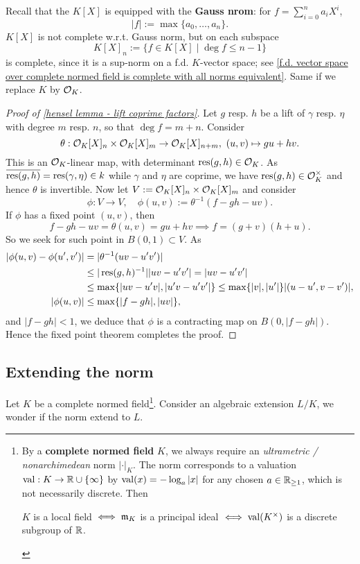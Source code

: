 Recall that the $K[X]$ is equipped with the \textbf{Gauss nrom}: for $f = \sum_{i=0}^n a_iX^i$,
\[|f| := \max\{a_0, \dots, a_n\}.\]
$K[X]$ is not complete w.r.t.\! Gauss norm,
but on each subspace\[K[X]_n := \{f\in K[X]\mid \deg f\le n - 1\}\]
is complete, since it is a sup-norm on a f.d.\! $K$-vector space;
see \cref{f.d. vector space over complete normed field is complete with all norms equivalent}.
Same if we replace $K$ by $\mathcal{O}_K$.
\begin{proof}
    [Proof of \cref{hensel lemma - lift coprime factors}]
    Let $g$ resp.\! $h$ be a lift of $\gamma$ resp.\! $\eta$ with degree $m$ resp.\! $n$,
    so that $\deg f = m + n$.
    Consider\[\theta : \mathcal{O}_K[X]_n\times \mathcal{O}_K[X]_m\to \mathcal{O}_K[X]_{n+m},\ (u, v)\mapsto gu + hv.\]
    This is an $\mathcal{O}_K$-linear map, with determinant $\operatorname{res}(g, h)\in \mathcal{O}_K$.
    As $\overline{\operatorname{res}(g, h)} = \operatorname{res}(\gamma, \eta)\in k$
    while $\gamma$ and $\eta$ are coprime, we have $\operatorname{res}(g, h)\in\mathcal{O}_K^\times$ and hence $\theta$ is invertible.
    Now let $V := \mathcal{O}_K[X]_n\times \mathcal{O}_K[X]_m$ and consider \[\phi : V\to V,\quad \phi(u, v) := \theta^{-1}(f - gh - uv).\]
    If $\phi$ has a fixed point $(u, v)$,
    then \[f - gh - uv = \theta(u, v) = gu + hv\implies f = (g + v)(h + u).\]
    So we seek for such point in $B(0, 1)\subset V $.
    As \begin{align*}
        |\phi(u, v) - \phi(u', v')| &= |\theta^{-1}(uv - u'v')|\\ &
        \le |\operatorname{res}(g, h)^{-1}| |uv - u'v'| = |uv - u'v'|\\ &
        \le \max\{|uv - u'v|, |u'v - u'v'|\}
        \le \max\{|v|, |u'|\}|(u - u', v - v')|,\\
        |\phi(u, v)| &\le\max\{|f - gh|, |uv|\},
    \end{align*}
    and $|f - gh| < 1$,
    we deduce that $\phi$ is a contracting map on $B(0, |f - gh|)$.
    Hence the fixed point theorem completes the proof.
\end{proof}

\subsection{Extending the norm}
Let $K$ be a complete normed field\footnote{By a \textbf{complete normed field} $K$,
we always require an \textit{ultrametric / nonarchimedean} norm $|\cdot|_K$. The norm corresponds to a valuation $\operatorname{val} : K\to\mathbb{R}\cup\{\infty\}$ by $\operatorname{val}(x) = -\log_a|x|$ for any chosen $a\in \mathbb{R}_{\ge 1}$, which is not necessarily discrete.
Then \begin{center}
    $K$ is a local field $\iff \mathfrak{m}_K$ is a principal ideal $\iff \operatorname{val}(K^\times)$ is a discrete subgroup of $\mathbb{R}$.
\end{center}
}.
Consider an algebraic extension $L/K$, we wonder if the norm extend to $L$.

